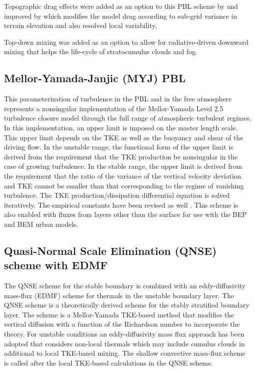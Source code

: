 Topographic drag effects were added as an option to this PBL scheme by \citet{jimenez12a} and improved by \citet{lorente16} which modifies the
model drag according to sub-grid variance in terrain elevation and also resolved local variability.
 
 Top-down mixing was
added as an option \citep{wilson18} to allow for radiative-driven downward mixing that helps the life-cycle of stratocumulus clouds and fog.

\subsection{Mellor-Yamada-Janjic (MYJ) PBL}

This parameterization of turbulence in the PBL and in the free atmosphere 
\citep{janjic90,janjic96,janjic02} represents a nonsingular implementation of 
the Mellor-Yamada Level 2.5 turbulence closure model \citep{melloryamada82} 
through the full range of atmospheric turbulent regimes. 
In this implementation, an upper limit is imposed on the master length scale. 
This upper limit depends on the TKE as well as the buoyancy and shear of the driving flow. 
In the unstable range, the functional form of the upper limit is derived from the 
requirement that the TKE production be nonsingular in the case of growing turbulence. 
In the stable range, the upper limit is derived from the requirement that the 
ratio of the variance of the vertical velocity deviation and TKE cannot be 
smaller than that corresponding to the regime of vanishing turbulence. 
The TKE production/dissipation differential equation is solved iteratively. 
The empirical constants have been revised as well \citep{janjic96,janjic02}. 
This scheme is also enabled with fluxes from layers other than the surface for use with
the BEP and BEM urban models.

\subsection{Quasi-Normal Scale Elimination (QNSE) scheme with EDMF}

The QNSE scheme for the stable boundary is combined with an eddy-diffusivity mass-flux (EDMF) scheme for thermals in the unstable
boundary layer. The QNSE scheme \citep{sukoriansky05} is a theoretically derived scheme for the stably stratified boundary layer.
The scheme is a Mellor-Yamada TKE-based method that modifies the vertical diffusion with a function of the Richardson number
to incorporate the theory. For unstable conditions an eddy-diffusivity mass flux approach has
been adopted \citep{pergaud09} that considers non-local thermals which may include cumulus clouds in additional to local
TKE-based mixing. The shallow convective mass-flux scheme is called after the local TKE-based calculations in the QNSE scheme.

